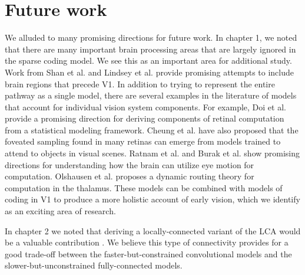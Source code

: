 \section{Future work}\label{sec:ch5_future_work}
We alluded to many promising directions for future work.
In chapter 1, we noted that there are many important brain processing areas that are largely ignored in the sparse coding model. %
We see this as an important area for additional study.
Work from Shan et al. \citeyearpar{shan2013efficient} and Lindsey et al. \citeyearpar{lindsey2019unified} provide promising attempts to include brain regions that precede V1.
In addition to trying to represent the entire pathway as a single model, there are several examples in the literature of models that account for individual vision system components.
For example, Doi et al. \citeyearpar{doi2007theory} provide a promising direction for deriving components of retinal computation from a statistical modeling framework.
Cheung et al. \citeyearpar{cheung2016emergence} have also proposed that the foveated sampling found in many retinas can emerge from models trained to attend to objects in visual scenes.
Ratnam et al. \citeyearpar{ratnam2017benefits} and Burak et al. \citeyearpar{burak2010bayesian} show promising directions for understanding how the brain can utilize eye motion for computation.
Olshausen et al. \citeyearpar{olshausen1993neurobiological} proposes a dynamic routing theory for computation in the thalamus.
These models can be combined with models of coding in V1 to produce a more holistic account of early vision, which we identify as an exciting area of research.

In chapter 2 we noted that deriving a locally-connected variant of the LCA would be a valuable contribution \parencite{le2011building, ngiam2010tiled}. %
We believe this type of connectivity provides for a good trade-off between the faster-but-constrained convolutional models and the slower-but-unconstrained fully-connected models.

